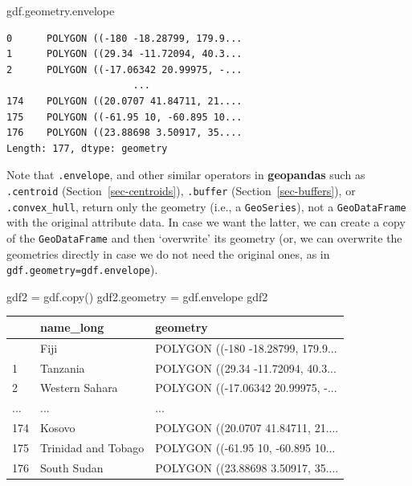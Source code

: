 \documentclass[
  letterpaper,
]{krantz}
\newenvironment{Shaded}{\begin{snugshade}}{\end{snugshade}}
\newcommand{\NormalTok}[1]{\textcolor[rgb]{0.00,0.23,0.31}{#1}}
\newcommand{\OperatorTok}[1]{\textcolor[rgb]{0.37,0.37,0.37}{#1}}
\begin{document}
\begin{Shaded}
\begin{Highlighting}[]
\NormalTok{gdf.geometry.envelope}
\end{Highlighting}
\end{Shaded}

\begin{verbatim}
0      POLYGON ((-180 -18.28799, 179.9...
1      POLYGON ((29.34 -11.72094, 40.3...
2      POLYGON ((-17.06342 20.99975, -...
                      ...                
174    POLYGON ((20.0707 41.84711, 21....
175    POLYGON ((-61.95 10, -60.895 10...
176    POLYGON ((23.88698 3.50917, 35....
Length: 177, dtype: geometry
\end{verbatim}

Note that \texttt{.envelope}, and other similar operators in
\textbf{geopandas} such as \texttt{.centroid}
(Section~\ref{sec-centroids}), \texttt{.buffer}
(Section~\ref{sec-buffers}), or \texttt{.convex\_hull}, return only the
geometry (i.e., a \texttt{GeoSeries}), not a \texttt{GeoDataFrame} with
the original attribute data. In case we want the latter, we can create a
copy of the \texttt{GeoDataFrame} and then `overwrite' its geometry (or,
we can overwrite the geometries directly in case we do not need the
original ones, as in \texttt{gdf.geometry=gdf.envelope}).

\begin{Shaded}
\begin{Highlighting}[]
\NormalTok{gdf2 }\OperatorTok{=}\NormalTok{ gdf.copy()}
\NormalTok{gdf2.geometry }\OperatorTok{=}\NormalTok{ gdf.envelope}
\NormalTok{gdf2}
\end{Highlighting}
\end{Shaded}

\begin{longtable}[]{@{}lll@{}}
\toprule\noalign{}
& name\_long & geometry \\
\midrule\noalign{}
\endhead
\bottomrule\noalign{}
\endlastfoot
0 & Fiji & POLYGON ((-180 -18.28799, 179.9... \\
1 & Tanzania & POLYGON ((29.34 -11.72094, 40.3... \\
2 & Western Sahara & POLYGON ((-17.06342 20.99975, -... \\
... & ... & ... \\
174 & Kosovo & POLYGON ((20.0707 41.84711, 21.... \\
175 & Trinidad and Tobago & POLYGON ((-61.95 10, -60.895 10... \\
176 & South Sudan & POLYGON ((23.88698 3.50917, 35.... \\
\end{longtable}
\end{document}
